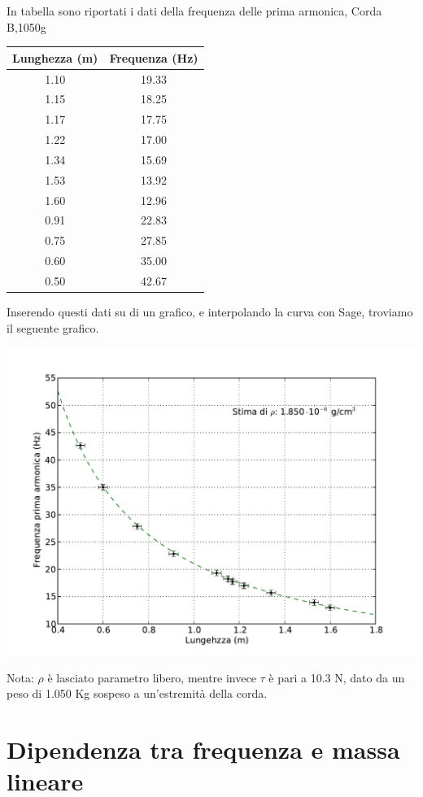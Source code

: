 In tabella sono riportati i dati della frequenza delle prima armonica, 
Corda B,1050g

\begin{center}
\begin{tabular}{|c|c|}
\toprule
Lunghezza (m) & Frequenza (Hz) \\
\midrule
1.10 & 19.33 \\
1.15 & 18.25 \\
1.17 & 17.75 \\
1.22 & 17.00 \\
1.34 & 15.69 \\
1.53 & 13.92 \\
1.60 & 12.96 \\
0.91 & 22.83 \\
0.75 & 27.85 \\
0.60 & 35.00 \\
0.50 & 42.67 \\
\bottomrule
\end{tabular}
\end{center}

Inserendo questi dati su di un grafico, e interpolando la curva con Sage, troviamo il seguente grafico.

\includegraphics[scale=0.75]{"../grafici/CordaPrimaArmonica"}

Nota: $\rho$ è lasciato parametro libero, mentre invece $\tau$ è pari a 10.3 N, dato da un peso di 1.050 Kg sospeso a un'estremità della corda.

\section{Dipendenza tra frequenza e massa lineare}


